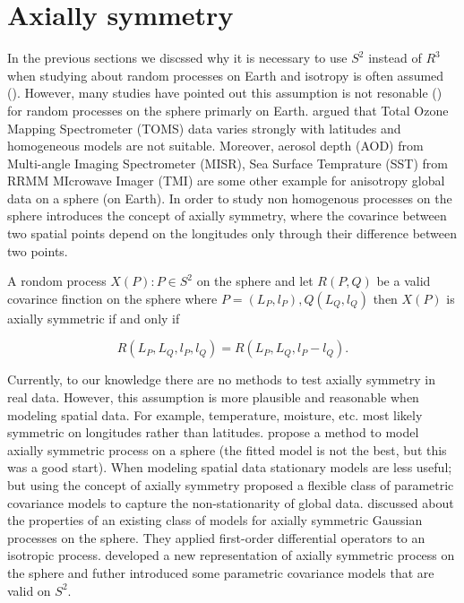 		\section{Axially symmetry}
			
		In the previous sections we discssed why it is necessary to use $S^2$ instead of $R^3$ when studying about random processes on Earth and isotropy is often assumed (\cite{Yadrenko1983, Yaglom1987}). However, many studies have pointed out this assumption is not resonable (\cite{Stein2007, JunStein2008, BolinLindgren2011}) for random processes on the sphere primarly on Earth. \cite{Stein2007} argued that Total Ozone Mapping Spectrometer (TOMS) data varies strongly with latitudes and homogeneous models are not suitable. Moreover, aerosol depth (AOD) from Multi-angle Imaging Spectrometer (MISR), Sea Surface Temprature (SST) from RRMM MIcrowave Imager (TMI) are some other example for anisotropy global data on a sphere (on Earth). In order to study non homogenous processes on the sphere \cite{Jones1963} introduces the concept of axially symmetry, where the covarince between two spatial points depend on the longitudes only through their difference  between two points.
			
		A rondom process $X(P): P\in S^2$ on the sphere and let $R(P,Q)$ be a valid covarince finction on the sphere where $P=(L_P, l_P), Q(L_Q,l_Q)$ then $X(P)$ is axially symmetric if and only if
		
		\[
			R(L_P, L_Q, l_P, l_Q) = R(L_P, L_Q, l_P-l_Q).
		\]
		
		Currently, to our knowledge there are no methods to test axially symmetry in real data. However, this assumption is more plausible and reasonable when modeling spatial data. For example, temperature, moisture, etc. most likely symmetric on longitudes rather than latitudes. \cite{Stein2007} propose a method to model axially symmetric process on a sphere (the fitted model is not the best, but this was a good start). When modeling spatial data stationary models are less useful; but using the concept of axially symmetry \cite{JunStein2008} proposed a flexible class of parametric covariance models to capture the non-stationarity of global data. \cite{HitczenkoStein2012} discussed about the properties of an existing class of models for axially symmetric Gaussian processes on the sphere. They applied first-order differential operators to an isotropic process. \cite{Huang2012} developed a new representation of axially symmetric process on the sphere and futher introduced some parametric covariance models that are valid on $S^2$.  \\
		
